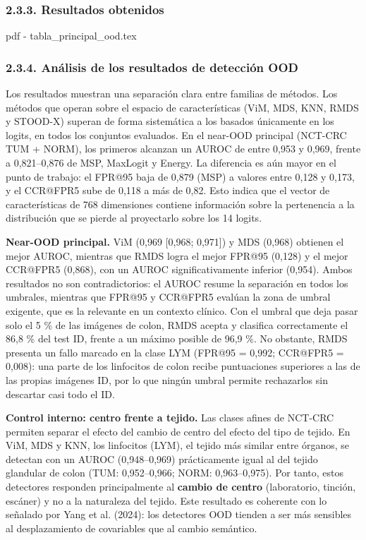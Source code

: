 \subsubsection{2.3.3. Resultados obtenidos}\label{resultados-obtenidos}

pdf - tabla\_principal\_ood.tex

\subsubsection{2.3.4. Análisis de los resultados de detección
OOD}\label{anuxe1lisis-de-los-resultados-de-detecciuxf3n-ood}

Los resultados muestran una separación clara entre familias de métodos.
Los métodos que operan sobre el espacio de características (ViM, MDS,
KNN, RMDS y STOOD-X) superan de forma sistemática a los basados
únicamente en los logits, en todos los conjuntos evaluados. En el
near-OOD principal (NCT-CRC TUM + NORM), los primeros alcanzan un AUROC
de entre 0,953 y 0,969, frente a 0,821--0,876 de MSP, MaxLogit y Energy.
La diferencia es aún mayor en el punto de trabajo: el FPR@95 baja de
0,879 (MSP) a valores entre 0,128 y 0,173, y el CCR@FPR5 sube de 0,118 a
más de 0,82. Esto indica que el vector de características de 768
dimensiones contiene información sobre la pertenencia a la distribución
que se pierde al proyectarlo sobre los 14 logits.

\textbf{Near-OOD principal.} ViM (0,969 {[}0,968; 0,971{]}) y MDS
(0,968) obtienen el mejor AUROC, mientras que RMDS logra el mejor FPR@95
(0,128) y el mejor CCR@FPR5 (0,868), con un AUROC significativamente
inferior (0,954). Ambos resultados no son contradictorios: el AUROC
resume la separación en todos los umbrales, mientras que FPR@95 y
CCR@FPR5 evalúan la zona de umbral exigente, que es la relevante en un
contexto clínico. Con el umbral que deja pasar solo el 5 \% de las
imágenes de colon, RMDS acepta y clasifica correctamente el 86,8 \% del
test ID, frente a un máximo posible de 96,9 \%. No obstante, RMDS
presenta un fallo marcado en la clase LYM (FPR@95 = 0,992; CCR@FPR5 =
0,008): una parte de los linfocitos de colon recibe puntuaciones
superiores a las de las propias imágenes ID, por lo que ningún umbral
permite rechazarlos sin descartar casi todo el ID.

\textbf{Control interno: centro frente a tejido.} Las clases afines de
NCT-CRC permiten separar el efecto del cambio de centro del efecto del
tipo de tejido. En ViM, MDS y KNN, los linfocitos (LYM), el tejido más
similar entre órganos, se detectan con un AUROC (0,948--0,969)
prácticamente igual al del tejido glandular de colon (TUM: 0,952--0,966;
NORM: 0,963--0,975). Por tanto, estos detectores responden
principalmente al \textbf{cambio de centro} (laboratorio, tinción,
escáner) y no a la naturaleza del tejido. Este resultado es coherente
con lo señalado por Yang et al. (2024): los detectores OOD tienden a ser
más sensibles al desplazamiento de covariables que al cambio semántico.

